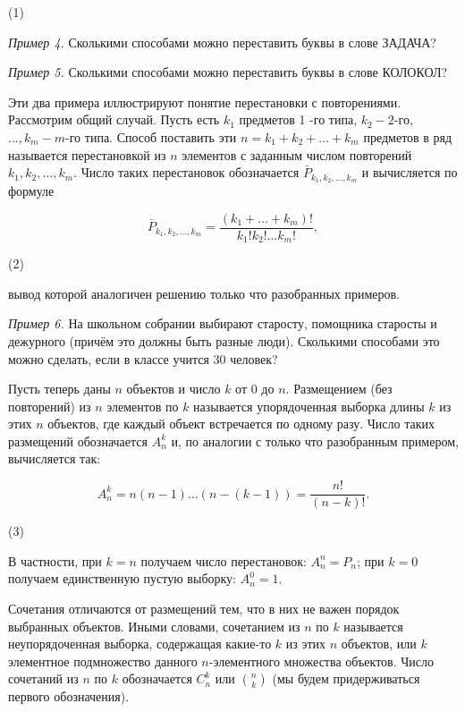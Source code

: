 \begin{flushright}
        \vspace{-10mm}
        (1)
\end{flushright}

\textit{Пример 4.} Сколькими способами можно переставить буквы в слове ЗАДАЧА?

\textit{Пример 5.} Сколькими способами можно переставить буквы в слове КОЛОКОЛ?

Эти два примера иллюстрируют понятие перестановки с повторениями. Рассмотрим общий случай. Пусть есть $k_1$ предметов 1 -го типа, $k_2-2$-го, $\ldots, k_m-m$-го типа. Способ поставить эти $n=k_1+k_2+\ldots+k_m$ предметов в ряд называется перестановкой из $n$ элементов с заданным числом повторений $k_1, k_2, \ldots, k_m$. Число таких перестановок обозначается $\bar{P}_{k_1, k_2, \ldots, k_m}$ и вычисляется по формуле

$$
\bar{P}_{k_1, k_2, \ldots, k_m}=\frac{\left(k_1+\ldots+k_m\right)!}{k_{1}!k_{2}!\ldots k_{m}!},
$$
\begin{flushright}
        \vspace{-10mm}
        (2)
\end{flushright}

вывод которой аналогичен решению только что разобранных примеров.

\textit{Пример 6.} На школьном собрании выбирают старосту, помощника старосты и дежурного (причём это должны быть разные люди). Сколькими способами это можно сделать, если в классе учится 30 человек?

Пусть теперь даны $n$ объектов и число $k$ от 0 до $n$. Размещением (без повторений) из $n$ элементов по $k$ называется упорядоченная выборка длины $k$ из этих $n$ объектов, где каждый объект встречается по одному разу. Число таких размещений обозначается $A_n^k$ и, по аналогии с только что разобранным примером, вычисляется так:

$$
A_n^k=n(n-1) \ldots(n-(k-1))=\frac{n!}{(n-k)!} .
$$
\begin{flushright}
        \vspace{-10mm}
        (3)
\end{flushright}

В частности, при $k=n$ получаем число перестановок: $A_n^n=P_n$; при $k=0$ получаем единственную пустую выборку: $A_n^0=1$.

Сочетания отличаются от размещений тем, что в них не важен порядок выбранных объектов. Иными словами, сочетанием из $n$ по $k$ называется неупорядоченная выборка, содержащая какие-то $k$ из этих $n$ объектов, или $k$ элементное подмножество данного $n$-элементного множества объектов. Число сочетаний из $n$ по $k$ обозначается $C_n^k$ или $\binom{n}{k}$ (мы будем придерживаться первого обозначения).

